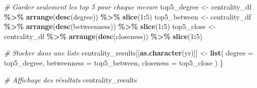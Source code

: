 \documentclass[
]{article}
\newenvironment{Shaded}{\begin{snugshade}}{\end{snugshade}}
\newcommand{\AttributeTok}[1]{\textcolor[rgb]{0.13,0.29,0.53}{#1}}
\newcommand{\CommentTok}[1]{\textcolor[rgb]{0.56,0.35,0.01}{\textit{#1}}}
\newcommand{\DecValTok}[1]{\textcolor[rgb]{0.00,0.00,0.81}{#1}}
\newcommand{\FunctionTok}[1]{\textcolor[rgb]{0.13,0.29,0.53}{\textbf{#1}}}
\newcommand{\NormalTok}[1]{#1}
\newcommand{\OtherTok}[1]{\textcolor[rgb]{0.56,0.35,0.01}{#1}}
\newcommand{\SpecialCharTok}[1]{\textcolor[rgb]{0.81,0.36,0.00}{\textbf{#1}}}
\begin{document}
\begin{Shaded}
\begin{Highlighting}[]
  \CommentTok{\# Garder seulement les top 5 pour chaque mesure}
\NormalTok{  top5\_degree }\OtherTok{\textless{}{-}}\NormalTok{ centrality\_df }\SpecialCharTok{\%\textgreater{}\%} \FunctionTok{arrange}\NormalTok{(}\FunctionTok{desc}\NormalTok{(degree)) }\SpecialCharTok{\%\textgreater{}\%} \FunctionTok{slice}\NormalTok{(}\DecValTok{1}\SpecialCharTok{:}\DecValTok{5}\NormalTok{)}
\NormalTok{  top5\_between }\OtherTok{\textless{}{-}}\NormalTok{ centrality\_df }\SpecialCharTok{\%\textgreater{}\%} \FunctionTok{arrange}\NormalTok{(}\FunctionTok{desc}\NormalTok{(betweenness)) }\SpecialCharTok{\%\textgreater{}\%} \FunctionTok{slice}\NormalTok{(}\DecValTok{1}\SpecialCharTok{:}\DecValTok{5}\NormalTok{)}
\NormalTok{  top5\_close }\OtherTok{\textless{}{-}}\NormalTok{ centrality\_df }\SpecialCharTok{\%\textgreater{}\%} \FunctionTok{arrange}\NormalTok{(}\FunctionTok{desc}\NormalTok{(closeness)) }\SpecialCharTok{\%\textgreater{}\%} \FunctionTok{slice}\NormalTok{(}\DecValTok{1}\SpecialCharTok{:}\DecValTok{5}\NormalTok{)}
  
  \CommentTok{\# Stocker dans une liste}
\NormalTok{  centrality\_results[[}\FunctionTok{as.character}\NormalTok{(yr)]] }\OtherTok{\textless{}{-}} \FunctionTok{list}\NormalTok{(}
    \AttributeTok{degree =}\NormalTok{ top5\_degree,}
    \AttributeTok{betweenness =}\NormalTok{ top5\_between,}
    \AttributeTok{closeness =}\NormalTok{ top5\_close}
\NormalTok{  )}
\NormalTok{\}}

\CommentTok{\# Affichage des résultats}
\NormalTok{centrality\_results}
\end{Highlighting}
\end{Shaded}
\end{document}

